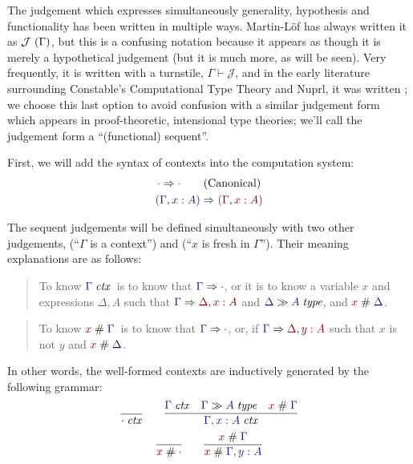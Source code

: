 \documentclass[main.tex]{subfiles}
\begin{document}
The judgement which expresses simultaneously generality, hypothesis and
functionality has been written in multiple ways. Martin-L\"of has always
written it as $\mathcal{J}\ (\Gamma)$, but this is a confusing notation
because it appears as though it is merely a hypothetical judgement (but it is
much more, as will be seen). Very frequently, it is written with a turnstile,
$\Gamma\vdash\mathcal{J}$, and in the early literature surrounding Constable's
Computational Type Theory and Nuprl, it was written
; we choose this last option to avoid
confusion with a similar judgement form which appears in proof-theoretic,
intensional type theories; we'll call the judgement form a ``(functional) sequent''.

First, we will add the syntax of contexts into the computation system:
\begin{gather*}
  \reduce{\cdot}{\cdot}\tag{Canonical}\\
  \reduce{(\Gamma,x:A)}{(\Gamma,x:A)}
\end{gather*}

The sequent judgements will be defined simultaneously with two other
judgements, \framebox{$\isctx{\Gamma}$} (``$\Gamma$ is a context'')
and  (``$x$ is fresh in
$\Gamma$''). Their meaning explanations are as follows:

\begin{quote}
  To know $\isctx\Gamma$\ is to know that $\reduce{\Gamma}{\cdot}$, or it is to know
  a variable $x$ and expressions $\Delta,A$ such that $\reduce{\Gamma}{\Delta, x:A}$
  and $\sequent{\Delta}{\isset{A}}$, and $\fresh{x}{\Delta}$.
\end{quote}

\begin{quote}
  To know $\fresh{x}{\Gamma}$\ is to know that
  $\reduce{\Gamma}{\cdot}$, or, if $\reduce{\Gamma}{\Delta,y:A}$
  such that $x$ is not $y$ and $\fresh{x}{\Delta}$.
\end{quote}

In other words, the well-formed contexts are inductively generated by the
following grammar:
\begin{gather*}
  \infer{\isctx\cdot}{}
  \qquad
  \infer{
    \isctx{\Gamma,x:A}
  }{
    \isctx\Gamma &
    \sequent{\Gamma}{\isset{A}} &
    \fresh{x}{\Gamma}
  }\\
  \infer{\fresh{x}{\cdot}}{}
  \qquad
  \infer{
    \fresh{x}{\Gamma,y:A}
  }{
    \fresh{x}{\Gamma}
  }
\end{gather*}
\end{document}
